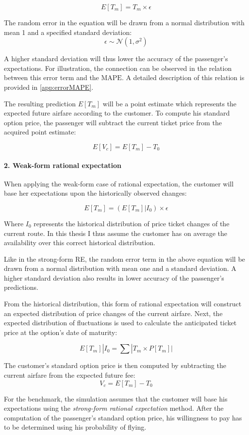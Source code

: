 $$ E[T_m] = T_m \times \epsilon$$

The random error in the equation will be drawn from a normal distribution with mean 1 and a specified standard deviation:
$$ \epsilon \sim \mathcal{N} (1, \sigma^2) $$

A higher standard deviation will thus lower the accuracy of the passenger's expectations. For illustration, the connection can be observed in the relation between this error term and the $\mbox{MAPE}$. A detailed description of this relation is provided in \autoref{app:errorMAPE}.

The resulting prediction $E[T_m]$ will be a point estimate which represents the expected future airfare according to the customer. To compute his standard option price, the passenger will subtract the current ticket price from the acquired point estimate:

$$ E[V_c] = E[T_m] - T_0$$


\paragraph{2. Weak-form rational expectation}
When applying the weak-form case of rational expectation, the customer will base her expectations upon the historically observed changes:

$$ E[T_m] = (E[T_m] | I_0) \times \epsilon $$

Where $I_0$ represents the historical distribution of price ticket changes of the current route. In this thesis I thus assume the customer has on average the availability over this correct historical distribution.

Like in the strong-form RE, the random error term in the above equation will be drawn from a normal distribution with mean one and a standard deviation. A higher standard deviation also results in lower accuracy of the passenger's predictions.

From the historical distribution, this form of rational expectation will construct an expected distribution of price changes of the current airfare. Next, the expected distribution of fluctuations is used to calculate the anticipated ticket price at the option's date of maturity:

$$ E[T_m] | I_0 = \sum |T_m \times P[T_m]| $$

The customer's standard option price is then computed by subtracting the current airfare from the expected future fee:
$$ V_c = E[T_m] - T_0 $$

For the benchmark, the simulation assumes that the customer will base his expectations using the \emph{strong-form rational expectation} method. After the computation of the passenger's standard option price, his willingness to pay has to be determined using his probability of flying.


